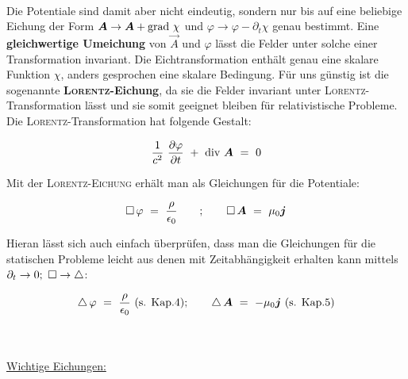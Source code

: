 \ \\

Die Potentiale sind damit aber nicht eindeutig, sondern nur bis auf eine beliebige Eichung der Form $\bm{A}\rightarrow\bm{A}+\text{grad }\chi$ und $\varphi \rightarrow\varphi-\partial_t\chi$ genau bestimmt. Eine \textbf{gleichwertige Umeichung} von $\vec{A}$ und $\varphi$ lässt die Felder unter solche einer Transformation invariant. Die Eichtransformation enthält genau eine skalare Funktion $\chi$, anders gesprochen eine skalare Bedingung. Für uns günstig ist die sogenannte \textbf{\textsc{Lorentz}-Eichung}, da sie die Felder invariant unter \textsc{Lorentz}-Transformation lässt und sie somit geeignet bleiben für relativistische Probleme. Die \textsc{Lorentz}-Transformation hat folgende Gestalt:

\begin{equation*}
\frac{1}{c^2} \ \pdiff{\varphi}{t} \ + \ \div \vec{A}  \ = \ 0
\end{equation*} 

Mit der \textsc{Lorentz-Eichung} erhält man als Gleichungen für die Potentiale:

\begin{equation*}
\Dalembert\varphi  \ = \ \frac{\rho}{\epsilon_0}	\qquad ; \qquad		\Dalembert\vec{A}  \ = \ \mu_0\vec{j} 
\end{equation*}

Hieran lässt sich auch einfach überprüfen, dass man die Gleichungen für die statischen Probleme leicht aus denen mit Zeitabhängigkeit erhalten kann mittels $\partial_t \rightarrow 0; \ \mathop{{}\Box}\nolimits \rightarrow \mathop{{}\bigtriangleup}\nolimits$:

\begin{equation*}
\laplace\varphi  \ = \ \frac{\rho}{\epsilon_0}\text{ (s. Kap.4)}; \qquad	\laplace\vec{A} \ = \ -\mu_0\vec{j} \text{ (s. Kap.5)} 	
\end{equation*}

\ \\
\ \\

\underline{Wichtige Eichungen:}


